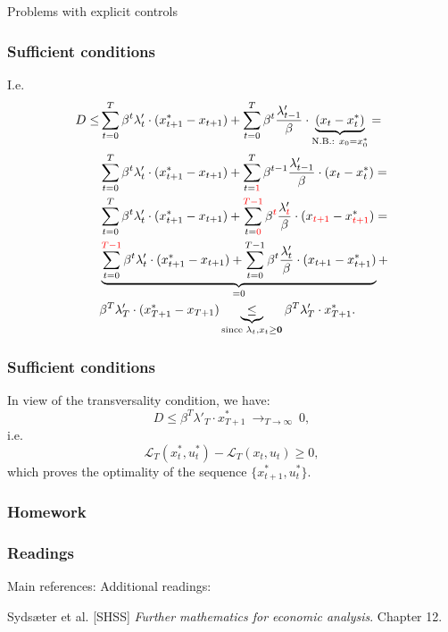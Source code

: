 \documentclass[10pt]{beamer}
\theoremstyle{definition}
\begin{document}
\begin{section}{Problems with explicit controls}
\begin{frame}[fragile]
\frametitle{Sufficient conditions}
I.e. \begin{equation*}
\begin{split}
 D \leq &   \sum_{t=0}^{T}\beta^t \lambda'_t \cdot (x^*_{t+1} - x_{t+1} ) +  \sum_{t=0}^{T}\beta^t \frac{\lambda'_{t-1}}{\beta}\cdot\underbrace{(x_t-x_t^*)}_{\text{N.B.: } x_0 = x^*_0} = \\
&  \sum_{t=0}^{T}\beta^t \lambda'_t \cdot (x^*_{t+1} - x_{t+1} ) +  \sum_{t = {\color{red}1}}^{T}\beta^{t-1} \frac{\lambda'_{t-1}}{\beta}\cdot(x_t-x_t^*)= \\
&  \sum_{t=0}^{T}\beta^t \lambda'_t \cdot (x^*_{t+1} - x_{t+1} ) +  \sum_{t = {\color{red} 0}}^{{\color{red} T-1}}\beta^{{\color{red} t}} \frac{\lambda'_{{\color{red} t}}}{\beta}\cdot(x_{{\color{red} t+1}}-x_{{\color{red} t+1}}^*)= \\
& \underbrace{\sum_{t=0}^{{\color{red} T-1}}\beta^t \lambda'_t \cdot (x^*_{t+1} - x_{t+1}) +  \sum_{t = 0}^{T-1}\beta^{t} \frac{\lambda'_{t}}{\beta}\cdot(x_{ t+1}-x_{t+1}^*)}_{=0} + \\
& \beta^T \lambda'_T \cdot (x^*_{T+1} - x_{T+1})  \underbrace{\leq}_{\text{since }\lambda_t,x_t \geq \mathbf{0}} \beta^T \lambda'_T \cdot x^*_{T+1}.
\end{split}
\end{equation*}
\end{frame}


\begin{frame}[fragile]
\frametitle{Sufficient conditions}
In view of the transversality condition, we have: \begin{equation*}
 D \leq  \beta^T \lambda'_T \cdot x^*_{T+1} ~ \mathop{\longrightarrow}_{T \rightarrow \infty} ~0 ,
\end{equation*}
i.e. 
\[  \mathcal{L}_T(x^*_t,u^*_t) - \mathcal{L}_T (x_t,u_t) \geq 0, \] which proves the optimality of the sequence
$\{x^*_{t+1},u^*_t\}$.
\end{frame}
\end{section}

\begin{frame}[fragile]
\frametitle{Homework}
\framesubtitle{}

\end{frame}


\begin{frame}[fragile]
\frametitle{Readings}
Main references:\bigskip
Additional readings:\bigskip

Syds\ae{}ter et al. [SHSS] \emph{Further mathematics for economic analysis}. Chapter 12.\bigskip
\end{frame}
\end{document}
